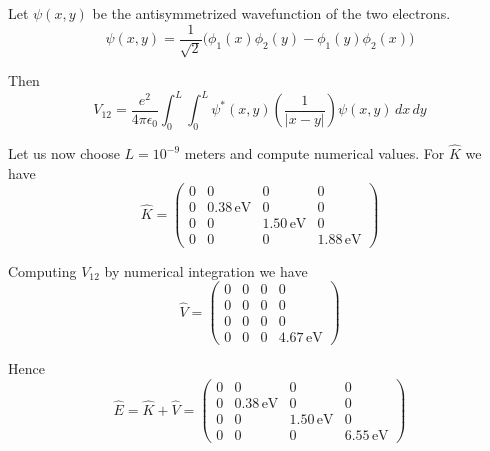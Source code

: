 \documentclass[12pt]{article}
\begin{document}
\noindent
Let $\psi(x,y)$ be the antisymmetrized wavefunction of the two electrons.
\begin{equation*}
\psi(x,y)=\frac{1}{\sqrt{2}}\big(\phi_1(x)\phi_2(y)-\phi_1(y)\phi_2(x)\big)
\end{equation*}

\noindent
Then
\begin{equation*}
V_{12}=\frac{e^2}{4\pi\epsilon_0}\int_0^L\int_0^L
\psi^*(x,y)\left(\frac{1}{|x-y|}\right)\psi(x,y)\,dx\,dy
\end{equation*}

\noindent
Let us now choose $L=10^{-9}$ meters and compute numerical values.
For $\hat{K}$ we have
\begin{equation*}
\hat{K}=\begin{pmatrix}
0 & 0 & 0 & 0\\
0 & 0.38\,\text{eV} & 0 & 0\\
0 & 0 & 1.50\,\text{eV} & 0\\
0 & 0 & 0 & 1.88\,\text{eV}
\end{pmatrix}
\end{equation*}

\noindent
Computing $V_{12}$ by numerical integration we have
\begin{equation*}
\hat{V}=\begin{pmatrix}
0 & 0 & 0 & 0\\
0 & 0 & 0 & 0\\
0 & 0 & 0 & 0\\
0 & 0 & 0 & 4.67\,\text{eV}
\end{pmatrix}
\end{equation*}

\noindent
Hence
\begin{equation*}
\hat{E}=\hat{K}+\hat{V}=\begin{pmatrix}
0 & 0 & 0 & 0\\
0 & 0.38\,\text{eV} & 0 & 0\\
0 & 0 & 1.50\,\text{eV} & 0\\
0 & 0 & 0 & 6.55\,\text{eV}
\end{pmatrix}
\end{equation*}
\end{document}
